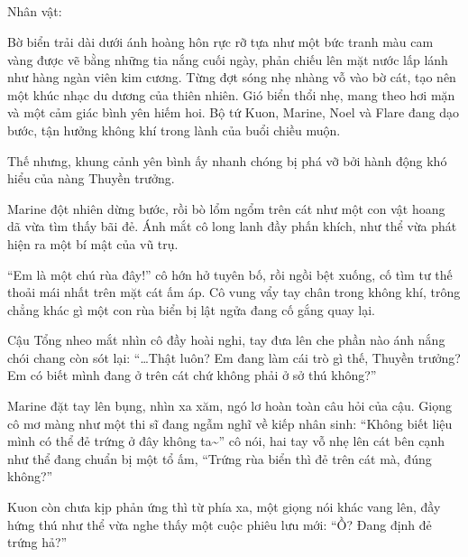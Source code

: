 \documentclass[../main.tex]{subfiles}
\begin{document}
\subsection*{\label{ep-S16.I}}
\vspace{-4pt}
\begin{center}
    {\caviar\fontsize{12pt}{12pt}\selectfont Nhân vật:    }
\end{center}

Bờ biển trải dài dưới ánh hoàng hôn rực rỡ tựa như một bức tranh màu cam vàng được vẽ bằng những tia nắng cuối ngày, phản chiếu lên mặt nước lấp lánh như hàng ngàn viên kim cương. Từng đợt sóng nhẹ nhàng vỗ vào bờ cát, tạo nên một khúc nhạc du dương của thiên nhiên. Gió biển thổi nhẹ, mang theo hơi mặn và một cảm giác bình yên hiếm hoi. Bộ tứ Kuon, Marine, Noel và Flare đang dạo bước, tận hưởng không khí trong lành của buổi chiều muộn.

Thế nhưng, khung cảnh yên bình ấy nhanh chóng bị phá vỡ bởi hành động khó hiểu của nàng Thuyền trưởng.

Marine đột nhiên dừng bước, rồi bò lổm ngổm trên cát như một con vật hoang dã vừa tìm thấy bãi đẻ. Ánh mắt cô long lanh đầy phấn khích, như thể vừa phát hiện ra một bí mật của vũ trụ.

``Em là một chú rùa đây!'' cô hớn hở tuyên bố, rồi ngồi bệt xuống, cố tìm tư thế thoải mái nhất trên mặt cát ấm áp. Cô vung vẩy tay chân trong không khí, trông chẳng khác gì một con rùa biển bị lật ngửa đang cố gắng quay lại.


Cậu Tổng nheo mắt nhìn cô đầy hoài nghi, tay đưa lên che phần nào ánh nắng chói chang còn sót lại: ``\dots Thật luôn? Em đang làm cái trò gì thế, Thuyền trưởng? Em có biết mình đang ở trên cát chứ không phải ở sở thú không?''

Marine đặt tay lên bụng, nhìn xa xăm, ngó lơ hoàn toàn câu hỏi của cậu. Giọng cô mơ màng như một thi sĩ đang ngẫm nghĩ về kiếp nhân sinh: ``Không biết liệu mình có thể đẻ trứng ở đây không ta\~{}'' cô nói, hai tay vỗ nhẹ lên cát bên cạnh như thể đang chuẩn bị một tổ ấm, ``Trứng rùa biển thì đẻ trên cát mà, đúng không?''

Kuon còn chưa kịp phản ứng thì từ phía xa, một giọng nói khác vang lên, đầy hứng thú như thể vừa nghe thấy một cuộc phiêu lưu mới: ``Ồ? Đang định đẻ trứng hả?''
\end{document}
